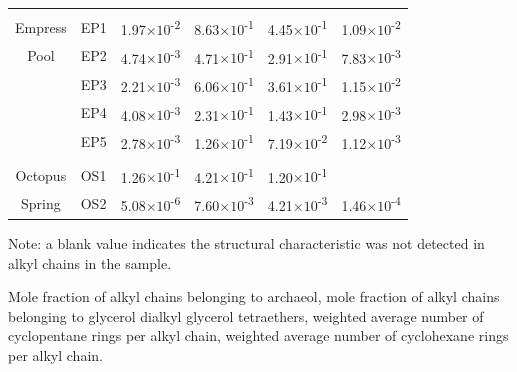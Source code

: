 {\begin{table}
\begin{threeparttable}
\begin{tabular}{clllcc}
      &       &       &       &       &  \\
Empress & EP1   & 1.97$\times 10$\textsuperscript{-2} & 8.63$\times 10$\textsuperscript{-1} & 4.45$\times 10$\textsuperscript{-1} & 1.09$\times 10$\textsuperscript{-2} \\
Pool  & EP2   & 4.74$\times 10$\textsuperscript{-3} & 4.71$\times 10$\textsuperscript{-1} & 2.91$\times 10$\textsuperscript{-1} & 7.83$\times 10$\textsuperscript{-3} \\
      & EP3   & 2.21$\times 10$\textsuperscript{-3} & 6.06$\times 10$\textsuperscript{-1} & 3.61$\times 10$\textsuperscript{-1} & 1.15$\times 10$\textsuperscript{-2} \\
      & EP4   & 4.08$\times 10$\textsuperscript{-3} & 2.31$\times 10$\textsuperscript{-1} & 1.43$\times 10$\textsuperscript{-1} & 2.98$\times 10$\textsuperscript{-3} \\
      & EP5   & 2.78$\times 10$\textsuperscript{-3} & 1.26$\times 10$\textsuperscript{-1} & 7.19$\times 10$\textsuperscript{-2} & 1.12$\times 10$\textsuperscript{-3} \\
      &       &       &       &       &  \\
Octopus & OS1   & 1.26$\times 10$\textsuperscript{-1} & 4.21$\times 10$\textsuperscript{-1} & 1.20$\times 10$\textsuperscript{-1} &  \\
Spring & OS2   & 5.08$\times 10$\textsuperscript{-6} & 7.60$\times 10$\textsuperscript{-3} & 4.21$\times 10$\textsuperscript{-3} & 1.46$\times 10$\textsuperscript{-4} \\
\bottomrule
\end{tabular}%

  
  \begin{tablenotes}
    \item Note: a blank value indicates the structural characteristic was not detected in alkyl chains in the sample.
    
     Mole fraction of alkyl chains belonging to archaeol,
     mole fraction of alkyl chains belonging to glycerol dialkyl glycerol tetraethers,
     weighted average number of cyclopentane rings per alkyl chain,
     weighted average number of cyclohexane rings per alkyl chain.
    \item
        
  \end{tablenotes}
  
  \label{tab:leftover_props}
  \end{threeparttable}
\end{table}
\setcounter{tabcounter}{0} %
\doublespace
\clearpage
}

